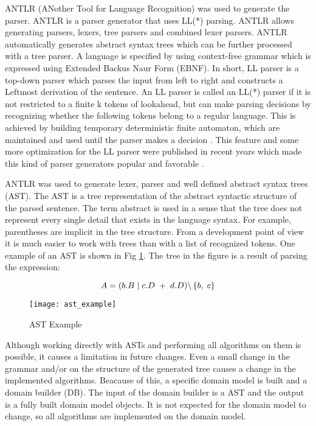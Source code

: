 ANTLR (ANother Tool for Language Recognition) was used to generate the parser. ANTLR is a 
parser generator that uses LL(*) parsing. ANTLR allows generating parsers, lexers, tree 
parsers and combined lexer parsers. ANTLR automatically generates abstract syntax trees
which can be further processed with a tree parser. A language is specified by using context-free
grammar which is expressed using Extended Backus Naur Form (EBNF). In short, LL parser is a 
top-down parser which parses the input from left to right and constructs a Leftmost derivation 
of the sentence. An LL parser is called an LL(*) parser if it is not restricted to a finite k 
tokens of lookahead, but can make parsing decisions by recognizing whether the following tokens
belong to a regular language. This is achieved by building temporary deterministic finite
automaton, which are maintained and used until the parser makes a decision \cite{ANTLRRef}. This feature and
some more optimization for the LL parser were published in recent years which made this kind 
of parser generators popular and favorable \cite{NiklausWirth}.

ANTLR was used to generate lexer, parser and well defined abstract syntax trees (AST). The AST
is a tree representation of the abstract syntactic structure of the parsed sentence. The term
abstract is used in a sense that the tree does not represent every single detail that exists 
in the language syntax. For example, parentheses are implicit in the tree structure. From a 
development point of view it is much easier to work with trees than with a list of recognized
tokens. One example of an AST is shown in  Fig \ref{fig:ast_example}. The tree in the figure 
is a result of parsing the expression: 

\begin{equation}\label{eq:ccs_example}
 A=( b.B \hspace{1 mm} | \hspace{1 mm} c.D \hspace{1 mm} + \hspace{1 mm} d.D )
\backslash \left\lbrace b, \hspace{1 mm} c \right\rbrace 
\end{equation}

\begin{figure}[!t]
\centering
\texttt{[image: ast\_example]}
\caption{AST Example}
\label{fig:ast_example}
\end{figure}

Although working directly with ASTs and performing all algorithms on them is possible, it causes 
a limitation in future changes. Even a small change in the grammar and/or on the structure of the
generated tree causes a change in the implemented algorithms. Beacause of this, a specific domain
model is built and a domain builder (DB). The input of the domain builder is a AST and the output is 
a fully built domain model objects. It is not expected for the domain model to change, so all 
algorithms are implemented on the domain model. 
